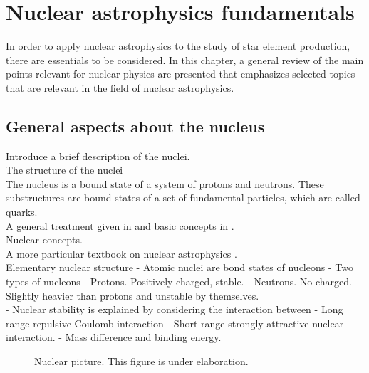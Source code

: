 \documentclass[openany]{book}
\begin{document}
\chapter{Nuclear astrophysics fundamentals}  \label{ch:nuclearAstrophysics}

In order to apply nuclear astrophysics to the study of star element production, there are essentials to be considered. In this chapter, a general review of the main points relevant for nuclear physics are presented that emphasizes selected topics that are relevant in the field of nuclear astrophysics.

\section{General aspects about the nucleus} \label{sec:nucleiAspects}
Introduce a brief description of the nuclei. \\
\indent The structure of the nuclei \\

The nucleus is a bound state of a system of protons and neutrons. These substructures are bound states of a set of fundamental particles, which are called quarks.  \\

A general treatment given in \cite{basdevant_rich_spiro_2004} and basic concepts in \cite{heyde_2020}. \\

\indent Nuclear concepts. \\

A more particular textbook on nuclear astrophysics \cite{iliadis_2015}. \\


Elementary nuclear structure 
-	Atomic nuclei are bond states of nucleons 
-	Two types of nucleons
	-	Protons. Positively charged, stable.
	-	Neutrons. No charged. Slightly heavier than protons and unstable by themselves. \\
	
-	Nuclear stability is explained by considering the interaction between 
	-	Long range repulsive Coulomb interaction 
	-   Short range strongly attractive nuclear interaction. 
	-	Mass difference and binding energy.
\\

\begin{figure}[H]
	
	\caption[Nuclear picture]{Nuclear picture. This figure is under elaboration.}
	\label{fig:nuclarPicture}
\end{figure}
\end{document}
